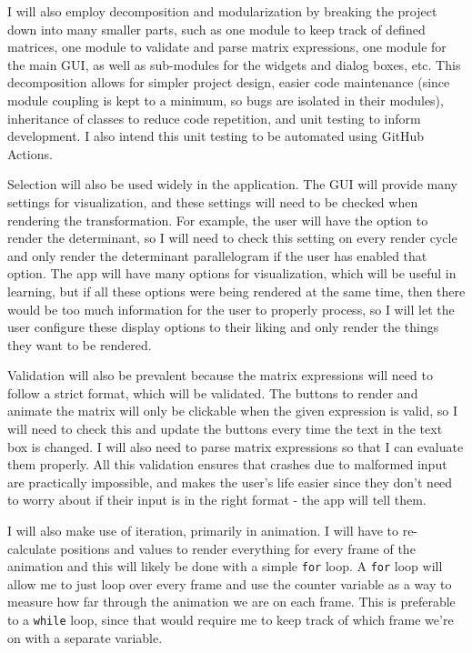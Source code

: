 \documentclass[../main.tex]{subfiles}
\begin{document}
I will also employ decomposition and modularization by breaking the project down into many smaller parts, such as one module to keep track of defined matrices, one module to validate and parse matrix expressions, one module for the main GUI, as well as sub-modules for the widgets and dialog boxes, etc. This decomposition allows for simpler project design, easier code maintenance (since module coupling is kept to a minimum, so bugs are isolated in their modules), inheritance of classes to reduce code repetition, and unit testing to inform development. I also intend this unit testing to be automated using GitHub Actions.

Selection will also be used widely in the application. The GUI will provide many settings for visualization, and these settings will need to be checked when rendering the transformation. For example, the user will have the option to render the determinant, so I will need to check this setting on every render cycle and only render the determinant parallelogram if the user has enabled that option. The app will have many options for visualization, which will be useful in learning, but if all these options were being rendered at the same time, then there would be too much information for the user to properly process, so I will let the user configure these display options to their liking and only render the things they want to be rendered.

Validation will also be prevalent because the matrix expressions will need to follow a strict format, which will be validated. The buttons to render and animate the matrix will only be clickable when the given expression is valid, so I will need to check this and update the buttons every time the text in the text box is changed. I will also need to parse matrix expressions so that I can evaluate them properly. All this validation ensures that crashes due to malformed input are practically impossible, and makes the user's life easier since they don't need to worry about if their input is in the right format - the app will tell them.

I will also make use of iteration, primarily in animation. I will have to re-calculate positions and values to render everything for every frame of the animation and this will likely be done with a simple \texttt{for} loop. A \texttt{for} loop will allow me to just loop over every frame and use the counter variable as a way to measure how far through the animation we are on each frame. This is preferable to a \texttt{while} loop, since that would require me to keep track of which frame we're on with a separate variable.
\end{document}
